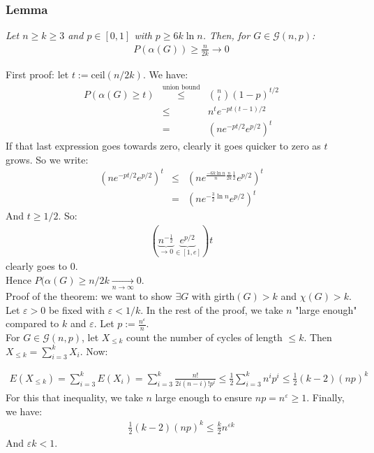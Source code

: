 \documentclass[11pt]{book}
\begin{document}
\subsubsection{Lemma}
\textit{Let $n \geq k \geq 3$ and $p \in [0,1]$ with $p \geq 6k \ln n$. Then, for $G \in \mathcal{G}(n,p)$:}
\begin{eqnarray}
	P(\alpha(G)) \geq \frac{n}{2k} \rightarrow 0
\end{eqnarray}

First proof: let $t := \text{ceil}(n/2k)$. We have:
\begin{eqnarray}
	P(\alpha(G) \geq t) &\overset{\text{union bound}}\leq& {{n}\choose{t}} (1 - p)^{t/2} \\
	&\leq& n^t e^{-pt(t-1)/2} \\
	&=& (ne^{-pt/2}e^{p/2})^t
\end{eqnarray}
If that last expression goes towards zero, clearly it goes quicker to zero as $t$ grows. So we write:
\begin{eqnarray}
	(ne^{-pt/2}e^{p/2})^t &\leq& (ne^{\frac{-6k\ln n}{n} \frac{n}{2k} \frac{1}{2}} e^{p/2})^t \\
	&=& (ne^{-\frac{3}{2} \ln n} e^{p/2})^t
\end{eqnarray}
And $t \geq 1/2$. So:
\begin{eqnarray}
	(\underbrace{n^{-\frac{1}{2}}}_{\rightarrow 0}  \underbrace{e^{p/2}}_{\in [1,e]})t
\end{eqnarray}
clearly goes to 0.\\
Hence $P(\alpha(G) \geq n/2k \underset{n \rightarrow \infty}\rightarrow 0$.\\

Proof of the theorem: we want to show $\exists G$ with girth$(G) > k$ and $\chi(G) > k$. Let $\varepsilon > 0$ be fixed with $\varepsilon < 1/k$. In the rest of the proof, we take $n$ "large enough" compared to $k$ and $\varepsilon$. Let $p := \frac{n^\varepsilon}{n}$.\\

For $G \in \mathcal{G}(n,p)$, let $X_{\leq k}$ count the number of cycles of length $\leq k$. Then $X_{\leq k} = \sum_{i = 3}^k X_i$. Now:

\begin{eqnarray}
	E(X_{\leq k}) = \sum_{i=3}^k E(X_i) = \sum_{i=3}^k \frac{n!}{2i(n-i)! p^i} \leq \frac{1}{2} \sum_{i=3}^k n^i p^i \leq \frac{1}{2} (k-2)(np)^k
\end{eqnarray}
For this that inequality, we take $n$ large enough to ensure $np = n^\varepsilon \geq 1$. Finally, we have:
\begin{eqnarray}
	\frac{1}{2} (k-2)(np)^k \leq \frac{k}{2} n^{\varepsilon k}
\end{eqnarray}
And $\varepsilon k < 1$.\\
\end{document}
